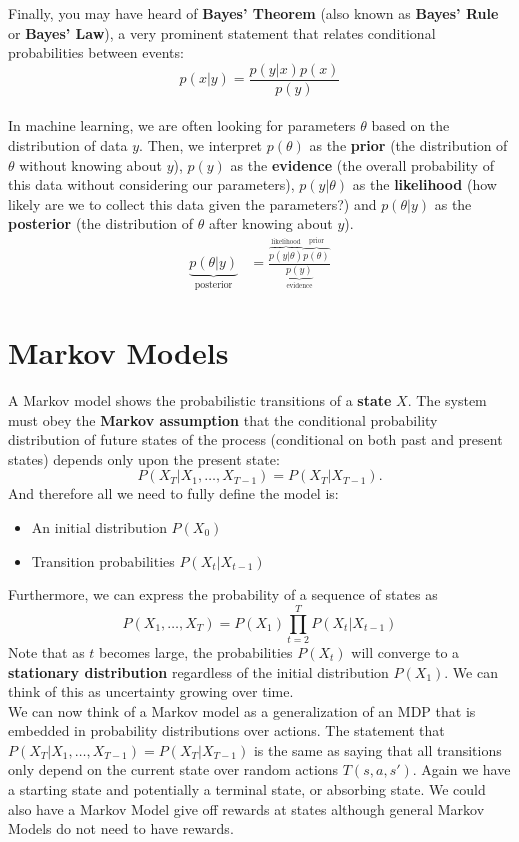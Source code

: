 \documentclass[a4paper]{article}
\begin{document}
\noindent Finally, you may have heard of {\bf{Bayes' Theorem}} (also known as {\bf{Bayes' Rule}} or {\bf{Bayes' Law}}), a very prominent statement that relates conditional probabilities between events:
$$ p(x | y) = \frac{p(y | x) p(x)}{p(y)} $$ \\
In machine learning, we are often looking for parameters $\theta$ based on the distribution of data $y$. Then, we interpret $p(\theta)$ as the {\bf{prior}} (the distribution of $\theta$ without knowing about $y$), $p(y)$ as the {\bf{evidence}} (the overall probability of this data without considering our parameters), $p( y | \theta)$ as the {\bf{likelihood}} (how likely are we to collect this data given the parameters?) and $p( \theta | y)$ as the {\bf{posterior}} (the distribution of $\theta$ after knowing about $y$).
\begin{align*}
\underbrace{p(\theta | y)}_{\text{posterior}}
&= \frac{\overbrace{ p(y | \theta) }^{\text{likelihood}} 
	\overbrace{ p(\theta) }^{\text{prior}}}
{\underbrace{p(y)}_{\text{evidence}}}
\end{align*}

\section*{Markov Models}
\noindent A Markov model shows the probabilistic transitions of a \textbf{state} $X$. The system must obey the {\bf{Markov assumption}} that the conditional probability distribution of future states of the process (conditional on both past and present states) depends only upon the present state:
\[
P(X_T|X_1, \ldots, X_{T-1}) = P(X_T|X_{T-1}).
\]
And therefore all we need to fully define the model is:
\begin{itemize}
    \item An initial distribution $P(X_0)$
    \item Transition probabilities $P(X_{t}|X_{t-1})$
\end{itemize}
Furthermore, we can express the probability of a sequence of states as
\[
P(X_1, \ldots, X_T) = P(X_1) \prod_{t=2}^T P(X_t|X_{t-1})
\]
Note that as $t$ becomes large, the probabilities $P(X_t)$ will converge to a \textbf{stationary distribution} regardless of the initial distribution $P(X_1)$. We can think of this as uncertainty growing over time. \\ 

\noindent We can now think of a Markov model as a generalization of an MDP that is embedded in probability distributions over actions. The statement that $P(X_T|X_1, \ldots, X_{T-1}) = P(X_T|X_{T-1})$ is the same as saying that all transitions only depend on the current state over random actions $T(s, a, s')$. Again we have a starting state and potentially a terminal state, or absorbing state. We could also have a Markov Model give off rewards at states although general Markov Models do not need to have rewards.
\end{document}
